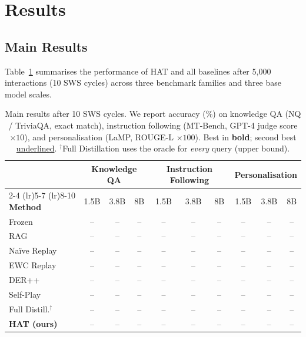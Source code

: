 \section{Results}
\label{sec:results}

\subsection{Main Results}
\label{sec:results:main}

Table~\ref{tab:main_results} summarises the performance of HAT and all baselines after 5{,}000 interactions (10 SWS cycles) across three benchmark families and three base model scales.

\begin{table}[t]
  \centering
  \caption{Main results after 10 SWS cycles.  We report accuracy (\%) on knowledge QA (NQ / TriviaQA, exact match), instruction following (MT-Bench, GPT-4 judge score $\times 10$), and personalisation (LaMP, ROUGE-L $\times 100$).  Best in \textbf{bold}; second best \underline{underlined}.  $^\dagger$Full Distillation uses the oracle for \emph{every} query (upper bound).}
  \label{tab:main_results}
  \small
  \setlength{\tabcolsep}{4pt}
  \begin{tabular}{@{}l ccc ccc ccc@{}}
    \toprule
    & \multicolumn{3}{c}{\textbf{Knowledge QA}} & \multicolumn{3}{c}{\textbf{Instruction Following}} & \multicolumn{3}{c}{\textbf{Personalisation}} \\
    \cmidrule(lr){2-4} \cmidrule(lr){5-7} \cmidrule(lr){8-10}
    \textbf{Method} & 1.5B & 3.8B & 8B & 1.5B & 3.8B & 8B & 1.5B & 3.8B & 8B \\
    \midrule
    Frozen          & --   & --   & --  & --   & --   & --  & --   & --   & -- \\
    RAG             & --   & --   & --  & --   & --   & --  & --   & --   & -- \\
    Na\"ive Replay  & --   & --   & --  & --   & --   & --  & --   & --   & -- \\
    EWC Replay      & --   & --   & --  & --   & --   & --  & --   & --   & -- \\
    DER++           & --   & --   & --  & --   & --   & --  & --   & --   & -- \\
    Self-Play       & --   & --   & --  & --   & --   & --  & --   & --   & -- \\
    \midrule
    Full Distill.$^\dagger$ & --  & --  & --  & --  & --  & --  & --  & --  & -- \\
    \midrule
    \textbf{HAT (ours)} & --  & --  & --  & --  & --  & --  & --  & --  & -- \\
    \bottomrule
  \end{tabular}
\end{table}

